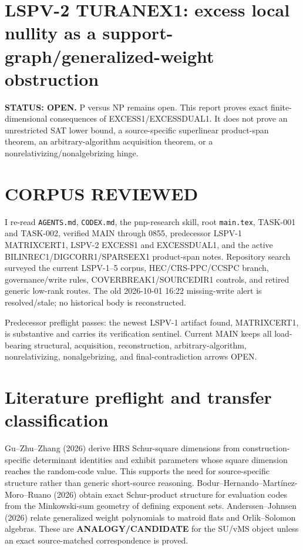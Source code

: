 \documentclass[11pt]{article}
\begin{document}
\section*{LSPV-2 TURANEX1: excess local nullity as a support-graph/generalized-weight obstruction}

\textbf{STATUS: OPEN.} P versus NP remains open. This report proves exact finite-dimensional consequences of EXCESS1/EXCESSDUAL1. It does not prove an unrestricted SAT lower bound, a source-specific superlinear product-span theorem, an arbitrary-algorithm acquisition theorem, or a nonrelativizing/nonalgebrizing hinge.

\section*{CORPUS REVIEWED}
I re-read \texttt{AGENTS.md}, \texttt{CODEX.md}, the pnp-research skill, root \texttt{main.tex}, TASK-001 and TASK-002, verified MAIN through 0855, predecessor LSPV-1 MATRIXCERT1, LSPV-2 EXCESS1 and EXCESSDUAL1, and the active BILINREC1/DIGCORR1/SPARSEEX1 product-span notes. Repository search surveyed the current LSPV-1--5 corpus, HEC/CRS-PPC/CCSPC branch, governance/write rules, COVERBREAK1/SOURCEDIR1 controls, and retired generic low-rank routes. The old 2026-10-01 16:22 missing-write alert is resolved/stale; no historical body is reconstructed.

Predecessor preflight passes: the newest LSPV-1 artifact found, MATRIXCERT1, is substantive and carries its verification sentinel. Current MAIN keeps all load-bearing structural, acquisition, reconstruction, arbitrary-algorithm, nonrelativizing, nonalgebrizing, and final-contradiction arrows OPEN.

\section*{Literature preflight and transfer classification}
Gu--Zhu--Zhang (2026) derive HRS Schur-square dimensions from construction-specific determinant identities and exhibit parameters whose square dimension reaches the random-code value. This supports the need for source-specific structure rather than generic short-source reasoning. Bodur--Hernando--Mart\'inez-Moro--Ruano (2026) obtain exact Schur-product structure for evaluation codes from the Minkowski-sum geometry of defining exponent sets. Anderssen--Johnsen (2026) relate generalized weight polynomials to matroid flats and Orlik--Solomon algebras. These are \textbf{ANALOGY/CANDIDATE} for the SU/vMS object unless an exact source-matched correspondence is proved.
\end{document}
